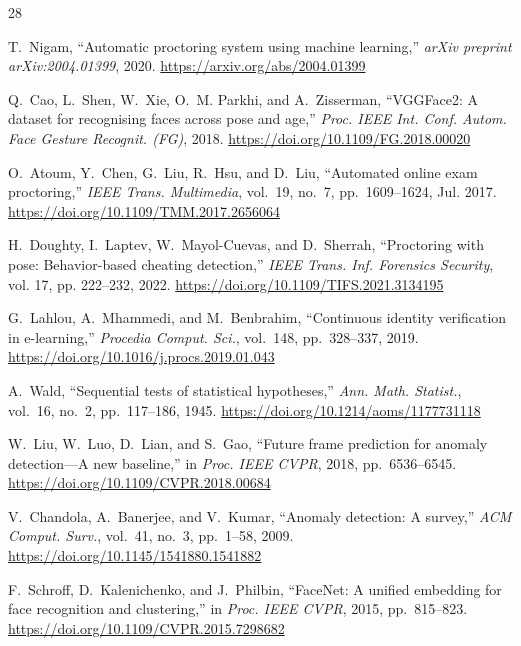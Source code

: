 \documentclass[journal]{IEEEtran}
\begin{document}
\begin{thebibliography}{28}

T.~Nigam, ``Automatic proctoring system using machine learning,'' \emph{arXiv preprint arXiv:2004.01399}, 2020. \url{https://arxiv.org/abs/2004.01399}

Q.~Cao, L.~Shen, W.~Xie, O.~M. Parkhi, and A.~Zisserman, ``VGGFace2: A dataset for recognising faces across pose and age,'' \emph{Proc. IEEE Int. Conf. Autom. Face Gesture Recognit. (FG)}, 2018. \url{https://doi.org/10.1109/FG.2018.00020}

O.~Atoum, Y.~Chen, G.~Liu, R.~Hsu, and D.~Liu, ``Automated online exam proctoring,'' \emph{IEEE Trans. Multimedia}, vol.~19, no.~7, pp.~1609--1624, Jul. 2017. \url{https://doi.org/10.1109/TMM.2017.2656064}

H.~Doughty, I.~Laptev, W.~Mayol-Cuevas, and D.~Sherrah, ``Proctoring with pose: Behavior-based cheating detection,'' \emph{IEEE Trans. Inf. Forensics Security}, vol. 17, pp. 222--232, 2022. \url{https://doi.org/10.1109/TIFS.2021.3134195}

G.~Lahlou, A.~Mhammedi, and M.~Benbrahim, ``Continuous identity verification in e-learning,'' \emph{Procedia Comput. Sci.}, vol.~148, pp.~328--337, 2019. \url{https://doi.org/10.1016/j.procs.2019.01.043}

A.~Wald, ``Sequential tests of statistical hypotheses,'' \emph{Ann. Math. Statist.}, vol.~16, no.~2, pp.~117--186, 1945. \url{https://doi.org/10.1214/aoms/1177731118}

W.~Liu, W.~Luo, D.~Lian, and S.~Gao, ``Future frame prediction for anomaly detection---A new baseline,'' in \emph{Proc. IEEE CVPR}, 2018, pp.~6536--6545. \url{https://doi.org/10.1109/CVPR.2018.00684}

V.~Chandola, A.~Banerjee, and V.~Kumar, ``Anomaly detection: A survey,'' \emph{ACM Comput. Surv.}, vol.~41, no.~3, pp.~1--58, 2009. \url{https://doi.org/10.1145/1541880.1541882}

F.~Schroff, D.~Kalenichenko, and J.~Philbin, ``FaceNet: A unified embedding for face recognition and clustering,'' in \emph{Proc. IEEE CVPR}, 2015, pp.~815--823. \url{https://doi.org/10.1109/CVPR.2015.7298682}


\end{thebibliography}
\end{document}
